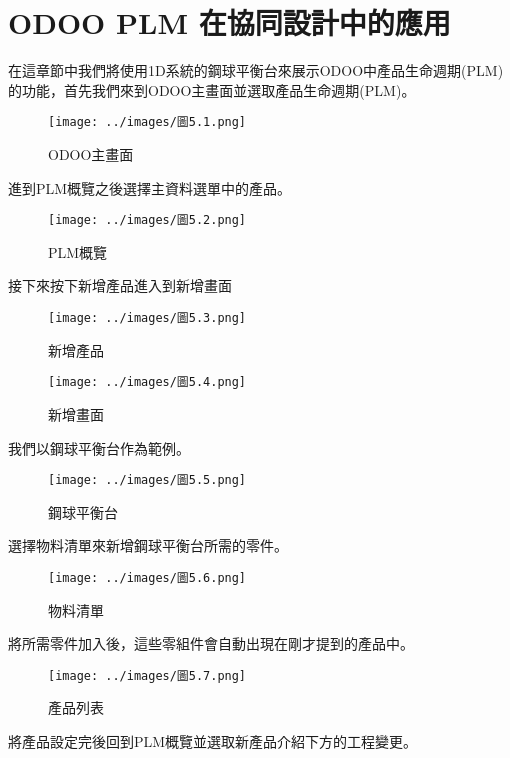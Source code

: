 \chapter{ODOO PLM 在協同設計中的應用}
在這章節中我們將使用1D系統的鋼球平衡台來展示ODOO中產品生命週期(PLM)的功能，首先我們來到ODOO主畫面並選取產品生命週期(PLM)。

\begin{figure}[h]
\centering
\texttt{[image: ../images/圖5.1.png]}
\caption{ODOO主畫面}
\end{figure}

進到PLM概覽之後選擇主資料選單中的產品。

\begin{figure}[h]
\centering
\texttt{[image: ../images/圖5.2.png]}
\caption{PLM概覽}
\end{figure}

接下來按下新增產品進入到新增畫面

\begin{figure}[h!]
\centering
\texttt{[image: ../images/圖5.3.png]}
\caption{新增產品}
\end{figure}

\begin{figure}[h!]
\centering
\texttt{[image: ../images/圖5.4.png]}
\caption{新增畫面}
\end{figure}

我們以鋼球平衡台作為範例。\\

\begin{figure}[hbt!]
\centering
\texttt{[image: ../images/圖5.5.png]}
\caption{鋼球平衡台}
\end{figure}

選擇物料清單來新增鋼球平衡台所需的零件。

\begin{figure}[h!]
\centering
\texttt{[image: ../images/圖5.6.png]}
\caption{物料清單}
\end{figure}

將所需零件加入後，這些零組件會自動出現在剛才提到的產品中。

\begin{figure}[h!]
\centering
\texttt{[image: ../images/圖5.7.png]}
\caption{產品列表}
\end{figure}

將產品設定完後回到PLM概覽並選取新產品介紹下方的工程變更。

